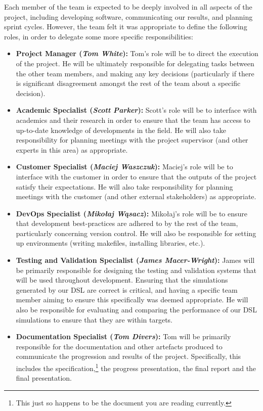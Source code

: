 Each member of the team is expected to be deeply involved in all aspects of the project, including developing software, communicating our results, and planning sprint cycles. However, the team felt it was appropriate to define the following roles, in order to delegate some more specific responsibilities:

\begin{itemize}
    \item \textbf{Project Manager (\textit{Tom White}):} Tom's role will be to direct the execution of the project. He will be ultimately responsible for delegating tasks between the other team members, and making any key decisions (particularly if there is significant disagreement amongst the rest of the team about a specific decision).

    \item \textbf{Academic Specialist (\textit{Scott Parker}):} Scott's role will be to interface with academics and their research in order to ensure that the team has access to up-to-date knowledge of developments in the field. He will also take responsibility for planning meetings with the project supervisor (and other experts in this area) as appropriate.

    \item \textbf{Customer Specialist (\textit{Maciej Waszczuk}):} Maciej's role will be to interface with the customer in order to ensure that the outputs of the project satisfy their expectations. He will also take responsibility for planning meetings with the customer (and other external stakeholders) as appropriate.

    \item \textbf{DevOps Specialist (\textit{Miko\l{}aj W\k{a}sacz}):} Miko\l{}aj's role will be to ensure that development best-practices are adhered to by the rest of the team, particularly concerning version control. He will also be responsible for setting up environments (writing makefiles, installing libraries, etc.). 

    \item \textbf{Testing and Validation Specialist (\textit{James Macer-Wright}):} James will be primarily responsible for designing the testing and validation systems that will be used throughout development. Ensuring that the simulations generated by our DSL are correct is critical, and having a specific team member aiming to ensure this specifically was deemed appropriate. He will also be responsible for evaluating and comparing the performance of our DSL simulations to ensure that they are within targets.

    \item \textbf{Documentation Specialist (\textit{Tom Divers}):} Tom will be primarily responsible for the documentation and other artefacts produced to communicate the progression and results of the project. Specifically, this includes the specification,\footnote{This just so happens to be the document you are reading currently.} the progress presentation, the final report and the final presentation. %
\end{itemize}

